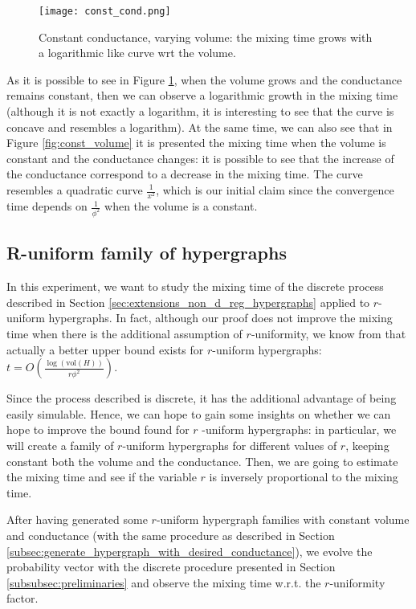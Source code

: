 \documentclass[../main.tex]{subfiles}
\begin{document}
        \begin{figure}[h]
            \centering
            \texttt{[image: const\_cond.png]}
            \caption{Constant conductance, varying volume: the mixing time grows with a logarithmic like curve wrt the volume.}
            \label{fig:const_conductance}
        \end{figure}
        
        As it is possible to see in Figure \ref{fig:const_conductance}, when the volume grows and the conductance remains constant, then we can observe a logarithmic growth in the mixing time (although it is not exactly a logarithm, it is interesting to see that the curve is concave and resembles a logarithm). At the same time, we can also see that in Figure \ref{fig:const_volume} it is presented the mixing time when the volume is constant and the conductance changes: it is possible to see that the increase of the conductance correspond to a decrease in the  mixing time. The curve resembles a quadratic curve $\frac{1}{x^2}$, which is our initial claim since the convergence time depends on $\frac{1}{\phi^2}$ when the volume is a constant.
        
    \subsection{R-uniform family of hypergraphs}
    
    In this experiment, we want to study the mixing time of the discrete process described in Section \ref{sec:extensions_non_d_reg_hypergraphs} applied to $r$-uniform hypergraphs. In fact, although our proof does not improve the mixing time when there is the additional assumption of $r$-uniformity, we know from \cite{continuous_laplacian_hypergraph} that actually a better upper bound exists for $r$-uniform hypergraphs: $t = O\left(\frac{\log(\text{vol}(H))}{r\phi^2}\right)$.
    
    Since the process described is discrete, it has the additional advantage of being easily simulable. Hence, we can hope to gain some insights on whether we can hope to improve the bound found for $r$ -uniform hypergraphs: in particular, we will create a family of $r$-uniform hypergraphs for different values of $r$, keeping constant both the volume and the conductance. Then, we are going to estimate the mixing time and see if the variable $r$ is inversely proportional to the mixing time. 
    
    After having generated some $r$-uniform hypergraph families with constant volume and conductance (with the same procedure as described in Section \ref{subsec:generate_hypergraph_with_desired_conductance}), we evolve the probability vector with the discrete procedure presented in Section \ref{subsubsec:preliminaries} and observe the mixing time w.r.t. the $r$-uniformity factor.
    
\end{document}
